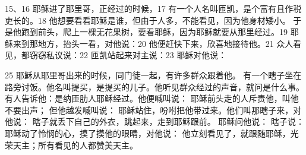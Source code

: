 15、16  耶稣进了耶里哥，正经过的时候，17  有一个人名叫匝凯，是个富有且作税吏长的。18  他想要看看耶稣是谁，但由于人多，不能看见，因为他身材矮小。 于是他跑到前头，爬上一棵无花果树，要看耶稣，因为耶稣就要从那里经过。19  耶稣来到那地方，抬头一看，对他说：20  他便赶快下来，欣喜地接待他。21  众人看见，都窃窃私议说：22  匝凯站起来对主说：23  耶稣对他说：\par

25 耶稣从耶里哥出来的时候，同门徒一起，有许多群众跟着他。 有一个瞎子坐在路旁讨饭。他名叫提买，是提买的儿子。他听见群众经过的声音，就问是什么事。 有人告诉他：是纳匝肋人耶稣经过。他便喊叫说：  耶稣前头走的人斥责他，叫他不要出声； 但他越发喊叫说：  耶稣站住，吩咐把他带过来。他们叫那瞎子来，对他说：  瞎子就丢下自己的外衣，跳起来，走到耶稣跟前。 耶稣问他说： 瞎子说：  耶稣动了怜悯的心，摸了摸他的眼睛，对他说： 他立刻看见了，就跟随耶稣，光荣天主；所有看见的人都赞美天主。\par


